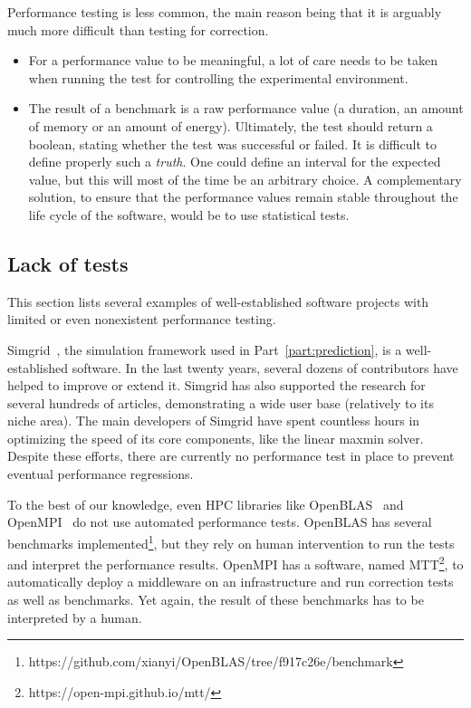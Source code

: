         Performance testing is less common, the main reason being that it is arguably much more difficult than testing
        for correction.
        \begin{itemize}
            \item For a performance value to be meaningful, a lot of care needs to be taken when running the test for
                controlling the experimental environment.
            \item The result of a benchmark is a raw performance value (\eg a duration, an amount of memory or an amount
                of energy). Ultimately, the test should return a boolean, stating whether the test was successful or
                failed. It is difficult to define properly such a \emph{truth}. One could define an interval for the
                expected value, but this will most of the time be an arbitrary choice. A complementary solution, to
                ensure that the performance values remain stable throughout the life cycle of the software, would be to
                use statistical tests.
        \end{itemize}

        \subsection{Lack of tests}%
        \label{sub:lack_of_tests}

            This section lists several examples of well-established software projects with limited or even nonexistent
            performance testing.

            Simgrid~\cite{simgrid}, the simulation framework used in Part~\ref{part:prediction}, is a well-established
            software. In the last twenty years, several dozens of contributors have helped to improve or extend it.
            Simgrid has also supported the research for several hundreds of articles, demonstrating a wide user base
            (relatively to its niche area). The main developers of Simgrid have spent countless hours in optimizing the
            speed of its core components, like the linear maxmin solver. Despite these efforts, there are currently no
            performance test in place to prevent eventual performance regressions.

            To the best of our knowledge, even HPC libraries like OpenBLAS~\cite{openblas} and OpenMPI~\cite{openmpi} do
            not use automated performance tests. OpenBLAS has several benchmarks
            implemented\footnote{https://github.com/xianyi/OpenBLAS/tree/f917c26e/benchmark}, but they rely on human
            intervention to run the tests and interpret the performance results. OpenMPI has a software, named
            MTT\footnote{https://open-mpi.github.io/mtt/}, to automatically deploy a middleware on an infrastructure and
            run correction tests as well as benchmarks. Yet again, the result of these benchmarks has to be interpreted
            by a human.


